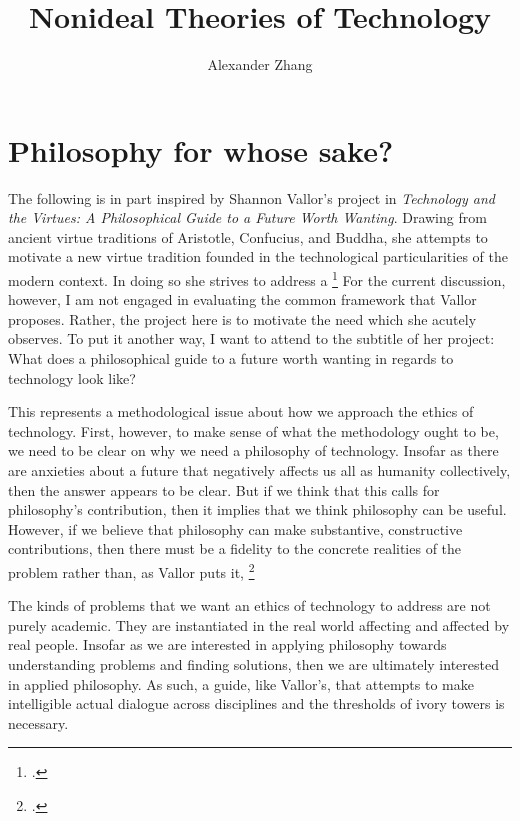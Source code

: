 \documentclass[letterpaper,notitlepage,12pt]{article}
\title{Nonideal Theories of Technology}
\author{Alexander Zhang}
\date{}
\begin{document}
\maketitle

\section{Philosophy for whose sake?}

The following is in part inspired by Shannon Vallor's project in
  \textit{Technology and the Virtues: A Philosophical Guide to a Future Worth
  Wanting}.
Drawing from ancient virtue traditions of Aristotle, Confucius, and Buddha, she
  attempts to motivate a new virtue tradition founded in the technological
  particularities of the modern context.
In doing so she strives to address a \footcite[p. 9]{vallor_technology_2018}
For the current discussion, however,  I am not engaged in evaluating the common
  framework that Vallor proposes.
Rather, the project here is to motivate the need which she acutely observes.
To put it another way, I want to attend to the subtitle of her project: What
does a philosophical guide to a future worth wanting in regards to technology
look like?

This represents a methodological issue about how we approach the ethics of
technology.
First, however, to make sense of what the methodology ought to be, we need to
be clear on why we need a philosophy of technology.
Insofar as there are anxieties about a future that negatively affects us all as
humanity collectively, then the answer appears to be clear.
But if we think that this calls for philosophy's contribution, then it implies
that we think philosophy can be useful.
However, if we believe that philosophy can make substantive, constructive
contributions, then there must be a fidelity to the concrete realities of the
problem rather than, as Vallor puts it, \footcite[p. 33]{vallor_technology_2018}

The kinds of problems that we want an ethics of technology to address are not
purely academic.
They are instantiated in the real world affecting and affected by real people.
Insofar as we are interested in applying philosophy towards understanding
problems and finding solutions, then we are ultimately interested in applied
philosophy.
As such, a guide, like Vallor's, that attempts to make intelligible actual
dialogue across disciplines and the thresholds of ivory towers is necessary.
\end{document}
